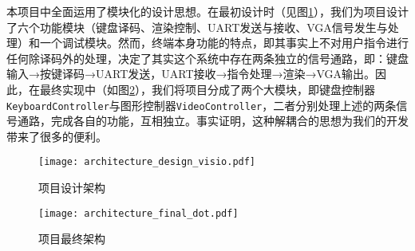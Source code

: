 
本项目中全面运用了模块化的设计思想。在最初设计时（见图\ref{fig:design_architecture}），我们为项目设计了六个功能模块（键盘译码、渲染控制、UART发送与接收、VGA信号发生与处理）和一个调试模块。然而，终端本身功能的特点，即其事实上不对用户指令进行任何除译码外的处理，决定了其实这个系统中存在两条独立的信号通路，即：键盘输入→按键译码→UART发送，UART接收→指令处理→渲染→VGA输出。因此，在最终实现中（如图\ref{fig:final_architecture}），我们将项目分成了两个大模块，即键盘控制器\texttt{KeyboardController}与图形控制器\texttt{VideoController}，二者分别处理上述的两条信号通路，完成各自的功能，互相独立。事实证明，这种解耦合的思想为我们的开发带来了很多的便利。

\begin{figure}[htbp]
\centerline{
\texttt{[image: architecture\_design\_visio.pdf]}
}
\label{fig:design_architecture}
\caption{项目设计架构}
\end{figure}

\begin{figure}[htbp]
\centerline{
\texttt{[image: architecture\_final\_dot.pdf]}
}
\label{fig:final_architecture}
\caption{项目最终架构}
\end{figure}